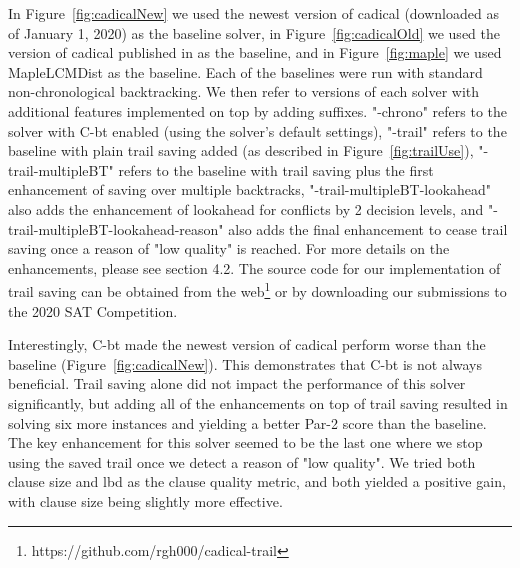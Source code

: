 \documentclass[runningheads]{llncs}
\newcommand{\cbt}{C-bt\xspace}
\begin{document}
In Figure~\ref{fig:cadicalNew} we used the newest version of cadical
(downloaded as of January 1, 2020) as the baseline solver, in
Figure~\ref{fig:cadicalOld} we used the version of cadical published
in \cite{DBLP:conf/sat/MohleB19} as the baseline, and in
Figure~\ref{fig:maple} we used MapleLCMDist \cite{DBLP:conf/ijcai/LuoLXML17,xiao2017maplelrb} as
the baseline. Each of the baselines were run with standard
non-chronological backtracking. We then refer to versions of each
solver with additional features implemented on top by adding
suffixes. "-chrono" refers to the solver with \cbt enabled (using the
solver's default settings), "-trail" refers to the baseline with plain
trail saving added (as described in Figure~\ref{fig:trailUse}),
"-trail-multipleBT" refers to the baseline with trail saving plus the
first enhancement of saving over multiple backtracks,
"-trail-multipleBT-lookahead" also adds the enhancement of lookahead
for conflicts by 2 decision levels, and
"-trail-multipleBT-lookahead-reason" also adds the final enhancement
to cease trail saving once a reason of "low quality" is reached. For
more details on the enhancements, please see section 4.2. The source
code for our implementation of trail saving can be obtained from the
web\footnote{https://github.com/rgh000/cadical-trail} or by downloading our submissions to the 2020 SAT Competition.


Interestingly, \cbt made the newest version of cadical perform worse
than the baseline (Figure~\ref{fig:cadicalNew}). This demonstrates
that \cbt is not always beneficial. Trail saving alone did not impact
the performance of this solver significantly, but adding all of the
enhancements on top of trail saving resulted in solving six more
instances and yielding a better Par-2 score than the baseline. The key
enhancement for this solver seemed to be the last one where we stop
using the saved trail once we detect a reason of "low quality". We
tried both clause size and lbd as the clause quality metric, and both
yielded a positive gain, with clause size being slightly more
effective.
\end{document}
